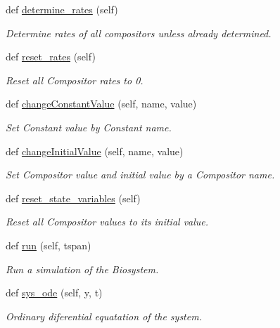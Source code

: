 \begin{DoxyCompactItemize}
def \hyperlink{classBiosystem_1_1BioSystem_a205261d80af190ce702f22669eccd341}{determine\+\_\+rates} (self)
\begin{DoxyCompactList}\small\item\em Determine rates of all compositors unless already determined. \end{DoxyCompactList}\item 
def \hyperlink{classBiosystem_1_1BioSystem_ae22d539e21d5ac6639aa3bd12f2ade3f}{reset\+\_\+rates} (self)
\begin{DoxyCompactList}\small\item\em Reset all Compositor rates to \textquotesingle{}0\textquotesingle{}. \end{DoxyCompactList}\item 
def \hyperlink{classBiosystem_1_1BioSystem_a17c5172bbaaa9ca3abcf69a2f81e4e9b}{change\+Constant\+Value} (self, name, value)
\begin{DoxyCompactList}\small\item\em Set Constant value by Constant name. \end{DoxyCompactList}\item 
def \hyperlink{classBiosystem_1_1BioSystem_a5d37581d1c60b7ddfc87a8a5f1855795}{change\+Initial\+Value} (self, name, value)
\begin{DoxyCompactList}\small\item\em Set Compositor value and initial value by a Compositor name. \end{DoxyCompactList}\item 
def \hyperlink{classBiosystem_1_1BioSystem_a4e9667583839b21fdc6c45ebda13e71d}{reset\+\_\+state\+\_\+variables} (self)
\begin{DoxyCompactList}\small\item\em Reset all Compositor values to its initial value. \end{DoxyCompactList}\item 
def \hyperlink{classBiosystem_1_1BioSystem_a91601ed19ad24fd580c14a17b638bebe}{run} (self, tspan)
\begin{DoxyCompactList}\small\item\em Run a simulation of the Biosystem. \end{DoxyCompactList}\item 
def \hyperlink{classBiosystem_1_1BioSystem_a2f4d71b00f3bcd3c8a82684cb4faf56a}{sys\+\_\+ode} (self, y, t)
\begin{DoxyCompactList}\small\item\em Ordinary diferential equatation of the system. \end{DoxyCompactList}\item 

\end{DoxyCompactItemize}
